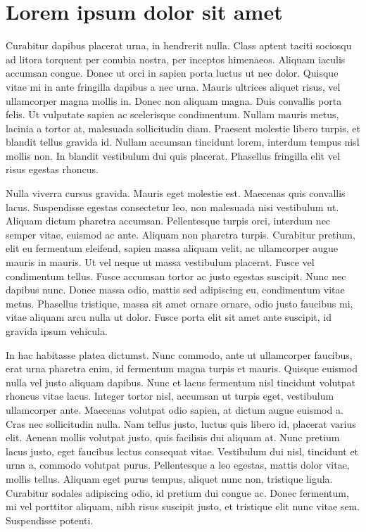 \documentclass{projetofinal-dcc}
\begin{document}
\section{Lorem ipsum dolor sit amet}\label{sec:LABEL_CHP_1_SEC_I}
Curabitur dapibus placerat urna, in hendrerit nulla. Class aptent taciti sociosqu ad litora torquent per conubia nostra, per inceptos himenaeos. Aliquam iaculis accumsan congue. Donec ut orci in sapien porta luctus ut nec dolor. Quisque vitae mi in ante fringilla dapibus a nec urna. Mauris ultrices aliquet risus, vel ullamcorper magna mollis in. Donec non aliquam magna. Duis convallis porta felis. Ut vulputate sapien ac scelerisque condimentum. Nullam mauris metus, lacinia a tortor at, malesuada sollicitudin diam. Praesent molestie libero turpis, et blandit tellus gravida id. Nullam accumsan tincidunt lorem, interdum tempus nisl mollis non. In blandit vestibulum dui quis placerat. Phasellus fringilla elit vel risus egestas rhoncus.

Nulla viverra cursus gravida. Mauris eget molestie est. Maecenas quis convallis lacus. Suspendisse egestas consectetur leo, non malesuada nisi vestibulum ut. Aliquam dictum pharetra accumsan. Pellentesque turpis orci, interdum nec semper vitae, euismod ac ante. Aliquam non pharetra turpis. Curabitur pretium, elit eu fermentum eleifend, sapien massa aliquam velit, ac ullamcorper augue mauris in mauris. Ut vel neque ut massa vestibulum placerat. Fusce vel condimentum tellus. Fusce accumsan tortor ac justo egestas suscipit. Nunc nec dapibus nunc. Donec massa odio, mattis sed adipiscing eu, condimentum vitae metus. Phasellus tristique, massa sit amet ornare ornare, odio justo faucibus mi, vitae aliquam arcu nulla ut dolor. Fusce porta elit sit amet ante suscipit, id gravida ipsum vehicula.

In hac habitasse platea dictumst. Nunc commodo, ante ut ullamcorper faucibus, erat urna pharetra enim, id fermentum magna turpis et mauris. Quisque euismod nulla vel justo aliquam dapibus. Nunc et lacus fermentum nisl tincidunt volutpat rhoncus vitae lacus. Integer tortor nisl, accumsan ut turpis eget, vestibulum ullamcorper ante. Maecenas volutpat odio sapien, at dictum augue euismod a. Cras nec sollicitudin nulla. Nam tellus justo, luctus quis libero id, placerat varius elit. Aenean mollis volutpat justo, quis facilisis dui aliquam at. Nunc pretium lacus justo, eget faucibus lectus consequat vitae. Vestibulum dui nisl, tincidunt et urna a, commodo volutpat purus. Pellentesque a leo egestas, mattis dolor vitae, mollis tellus. Aliquam eget purus tempus, aliquet nunc non, tristique ligula. Curabitur sodales adipiscing odio, id pretium dui congue ac. Donec fermentum, mi vel porttitor aliquam, nibh risus suscipit justo, et tristique elit nunc vitae sem. Suspendisse potenti.
\end{document}
